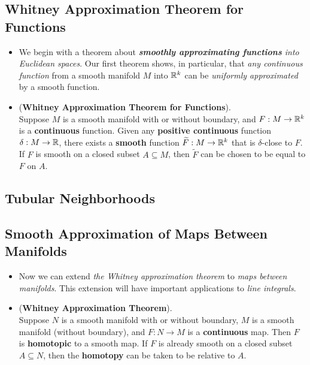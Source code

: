\documentclass[11pt]{article}
\begin{document}
\subsection{Whitney Approximation Theorem for Functions}
\begin{itemize}
\item We begin with a theorem about \emph{\textbf{smoothly approximating functions} into Euclidean spaces}. Our first theorem shows, in particular, that \emph{any continuous function} from a smooth manifold $M$ into ${\mathbb R}^k$ can be \emph{uniformly approximated} by a smooth function.

\item \begin{theorem} (\textbf{Whitney Approximation Theorem for Functions}). \\
Suppose $M$ is a smooth manifold with or without boundary, and $F: M \rightarrow {\mathbb R}^k$ is a \textbf{continuous} function. Given any \textbf{positive continuous} function $\delta: M \rightarrow {\mathbb R}$, there exists a \textbf{smooth} function $\widetilde{F}: M \rightarrow {\mathbb R}^k$ that is $\delta$-close to $F$. If $F$ is smooth on a closed subset $A \subseteq M$, then $\widetilde{F}$ can be chosen to be equal to $F$ on $A$.
\end{theorem}
\end{itemize}
\subsection{Tubular Neighborhoods}

\subsection{Smooth Approximation of Maps Between Manifolds}
\begin{itemize}
\item Now we can extend \emph{the Whitney approximation theorem} to \emph{maps between manifolds}. This extension will have important applications to \emph{line integrals}.

\item \begin{theorem} (\textbf{Whitney Approximation Theorem}). \\
Suppose $N$ is a smooth manifold with or without boundary, $M$ is a smooth manifold (without boundary), and $F: N \rightarrow M$ is a \textbf{continuous} map. Then $F$ is \textbf{homotopic} to a smooth map. If $F$ is already smooth on a closed subset $A \subseteq N$, then the \textbf{homotopy} can be taken to be relative to $A$.
\end{theorem}
\end{itemize}
\end{document}
